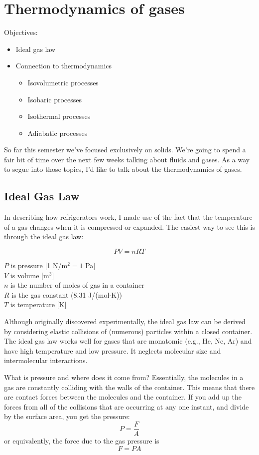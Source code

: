 \section{Thermodynamics of gases}
Objectives:
\begin{itemize}
\item Ideal gas law
\item Connection to thermodynamics
  \begin{itemize}
  \item Isovolumetric processes
  \item Isobaric processes
  \item Isothermal processes
  \item Adiabatic processes
  \end{itemize}
\end{itemize}

So far this semester we've focused exclusively on solids. We're going to spend a fair bit of time over the next few weeks talking about fluids and gases. As a way to segue into those topics, I'd like to talk about the thermodynamics of gases.

\subsection{Ideal Gas Law}
In describing how refrigerators work, I made use of the fact that the temperature of a gas changes when it is compressed or expanded. The easiest way to see this is through the ideal gas law: 

$$PV=nRT$$

$P$ is pressure [1 N/m$^2=1$ Pa]\\
$V$ is volume [m$^3$]\\
$n$ is the number of moles of gas in a container\\
$R$ is the gas constant (8.31 J/(mol$\cdot$K))\\
$T$ is temperature [K]

Although originally discovered experimentally, the ideal gas law can be derived by considering elastic collisions of (numerous) particles within a closed container. The ideal gas law works well for gases that are monatomic (e.g., He, Ne, Ar) and have high temperature and low pressure. It neglects molecular size and intermolecular interactions.

What is pressure and where does it come from? Essentially, the molecules in a gas are constantly colliding with the walls of the container. This means that there are contact forces between the molecules and the container. If you add up the forces from all of the collisions that are occurring at any one instant, and divide by the surface area, you get the pressure:
$$P=\frac{F}{A}$$
or equivalently, the force due to the gas pressure is
$$F=PA$$

